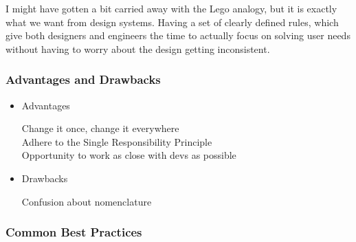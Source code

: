 I might have gotten a bit carried away with the Lego analogy, but it is exactly what we want from
design systems. Having a set of clearly defined rules, which give both designers and engineers the
time to actually focus on solving user needs without having to worry about the design getting
inconsistent. 

\subsubsection{Advantages and Drawbacks}

\begin{itemize}
	\item Advantages
	      \begin{description}
		      \item[Change it once, change it everywhere] 
		      \item[Adhere to the Single Responsibility Principle] %
		      \item[Opportunity to work as close with devs as possible] %
	      \end{description}
	\item Drawbacks
	      \begin{description}
		      \item[Confusion about nomenclature]

	      \end{description}
\end{itemize}

\subsubsection{Common Best Practices}
